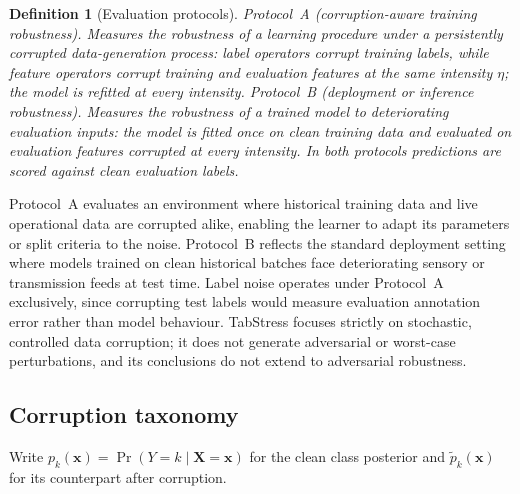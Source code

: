 \documentclass[pdflatex,sn-mathphys]{sn-jnl}
\theoremstyle{thmstyleone}
\theoremstyle{thmstyletwo}
\theoremstyle{thmstylethree}
\newtheorem{definition}{Definition}
\begin{document}
\begin{definition}[Evaluation protocols]\label{def:protocols}
\emph{Protocol~A (corruption-aware training robustness).} Measures the robustness of a learning procedure under a persistently corrupted data-generation process: label operators corrupt training labels, while feature operators corrupt training and evaluation features at the same intensity $\eta$; the model is refitted at every intensity. \emph{Protocol~B (deployment or inference robustness).} Measures the robustness of a trained model to deteriorating evaluation inputs: the model is fitted once on clean training data and evaluated on evaluation features corrupted at every intensity. In both protocols predictions are scored against clean evaluation labels.
\end{definition}

Protocol~A evaluates an environment where historical training data and live operational data are corrupted alike, enabling the learner to adapt its parameters or split criteria to the noise. Protocol~B reflects the standard deployment setting where models trained on clean historical batches face deteriorating sensory or transmission feeds at test time. Label noise operates under Protocol~A exclusively, since corrupting test labels would measure evaluation annotation error rather than model behaviour. TabStress focuses strictly on stochastic, controlled data corruption; it does not generate adversarial or worst-case perturbations, and its conclusions do not extend to adversarial robustness.

\subsection{Corruption taxonomy}\label{sec:problem:taxonomy}

Write $p_k(\mathbf{x})=\Pr(Y=k\mid\mathbf{X}=\mathbf{x})$ for the clean class posterior and $\tilde p_k(\mathbf{x})$ for its counterpart after corruption.
\end{document}
